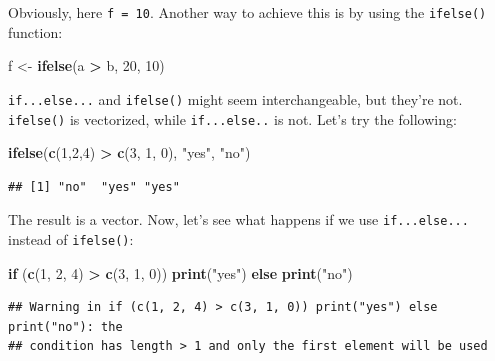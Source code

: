 \documentclass[]{gitbook}
\newenvironment{Shaded}{\begin{snugshade}}{\end{snugshade}}
\newcommand{\ControlFlowTok}[1]{\textcolor[rgb]{0.13,0.29,0.53}{\textbf{#1}}}
\newcommand{\DecValTok}[1]{\textcolor[rgb]{0.00,0.00,0.81}{#1}}
\newcommand{\KeywordTok}[1]{\textcolor[rgb]{0.13,0.29,0.53}{\textbf{#1}}}
\newcommand{\NormalTok}[1]{#1}
\newcommand{\OperatorTok}[1]{\textcolor[rgb]{0.81,0.36,0.00}{\textbf{#1}}}
\newcommand{\StringTok}[1]{\textcolor[rgb]{0.31,0.60,0.02}{#1}}
\begin{document}
Obviously, here \texttt{f\ =\ 10}. Another way to achieve this is by using the \texttt{ifelse()} function:

\begin{Shaded}
\begin{Highlighting}[]
\NormalTok{f <-}\StringTok{ }\KeywordTok{ifelse}\NormalTok{(a }\OperatorTok{>}\StringTok{ }\NormalTok{b, }\DecValTok{20}\NormalTok{, }\DecValTok{10}\NormalTok{)}
\end{Highlighting}
\end{Shaded}

\texttt{if...else...} and \texttt{ifelse()} might seem interchangeable, but they're not. \texttt{ifelse()} is vectorized, while
\texttt{if...else..} is not. Let's try the following:

\begin{Shaded}
\begin{Highlighting}[]
\KeywordTok{ifelse}\NormalTok{(}\KeywordTok{c}\NormalTok{(}\DecValTok{1}\NormalTok{,}\DecValTok{2}\NormalTok{,}\DecValTok{4}\NormalTok{) }\OperatorTok{>}\StringTok{ }\KeywordTok{c}\NormalTok{(}\DecValTok{3}\NormalTok{, }\DecValTok{1}\NormalTok{, }\DecValTok{0}\NormalTok{), }\StringTok{"yes"}\NormalTok{, }\StringTok{"no"}\NormalTok{)}
\end{Highlighting}
\end{Shaded}

\begin{verbatim}
## [1] "no"  "yes" "yes"
\end{verbatim}

The result is a vector. Now, let's see what happens if we use \texttt{if...else...} instead of \texttt{ifelse()}:

\begin{Shaded}
\begin{Highlighting}[]
\ControlFlowTok{if}\NormalTok{ (}\KeywordTok{c}\NormalTok{(}\DecValTok{1}\NormalTok{, }\DecValTok{2}\NormalTok{, }\DecValTok{4}\NormalTok{) }\OperatorTok{>}\StringTok{ }\KeywordTok{c}\NormalTok{(}\DecValTok{3}\NormalTok{, }\DecValTok{1}\NormalTok{, }\DecValTok{0}\NormalTok{)) }\KeywordTok{print}\NormalTok{(}\StringTok{"yes"}\NormalTok{) }\ControlFlowTok{else} \KeywordTok{print}\NormalTok{(}\StringTok{"no"}\NormalTok{)}
\end{Highlighting}
\end{Shaded}

\begin{verbatim}
## Warning in if (c(1, 2, 4) > c(3, 1, 0)) print("yes") else print("no"): the
## condition has length > 1 and only the first element will be used
\end{verbatim}
\end{document}
